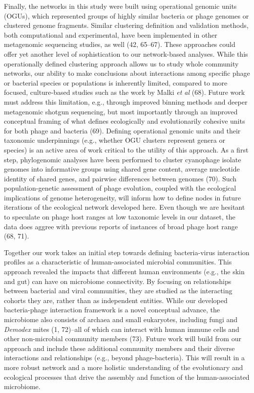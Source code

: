 \documentclass[12pt,]{article}
\begin{document}
Finally, the networks in this study were built using operational genomic
units (OGUs), which represented groups of highly similar bacteria or
phage genomes or clustered genome fragments. Similar clustering
definition and validation methods, both computational and experimental,
have been implemented in other metagenomic sequencing studies, as well
(42, 65--67). These approaches could offer yet another level of
sophistication to our network-based analyses. While this operationally
defined clustering approach allows us to study whole community networks,
our ability to make conclusions about interactions among specific phage
or bacterial species or populations is inherently limited, compared to
more focused, culture-based studies such as the work by Malki \emph{et
al} (68). Future work must address this limitation, e.g., through
improved binning methods and deeper metagenomic shotgun sequencing, but
most importantly through an improved conceptual framing of what defines
ecologically and evolutionarily cohesive units for both phage and
bacteria (69). Defining operational genomic units and their taxonomic
underpinnings (e.g., whether OGU clusters represent genera or species)
is an active area of work critical to the utility of this approach. As a
first step, phylogenomic analyses have been performed to cluster
cyanophage isolate genomes into informative groups using shared gene
content, average nucleotide identity of shared genes, and pairwise
differences between genomes (70). Such population-genetic assessment of
phage evolution, coupled with the ecological implications of genome
heterogeneity, will inform how to define nodes in future iterations of
the ecological network developed here. Even though we are hesitant to
speculate on phage host ranges at low taxonomic levels in our dataset,
the data does aggree with previous reports of instances of broad phage
host range (68, 71).

Together our work takes an initial step towards defining bacteria-virus
interaction profiles as a characteristic of human-associated microbial
communities. This approach revealed the impacts that different human
environments (e.g., the skin and gut) can have on microbiome
connectivity. By focusing on relationships between bacterial and viral
communities, they are studied as the interacting cohorts they are,
rather than as independent entities. While our developed bacteria-phage
interaction framework is a novel conceptual advance, the microbiome also
consists of archaea and small eukaryotes, including fungi and
\emph{Demodex} mites (1, 72)--all of which can interact with human
immune cells and other non-microbial community members (73). Future work
will build from our approach and include these additional community
members and their diverse interactions and relationships (e.g., beyond
phage-bacteria). This will result in a more robust network and a more
holistic understanding of the evolutionary and ecological processes that
drive the assembly and function of the human-associated microbiome.
\end{document}
